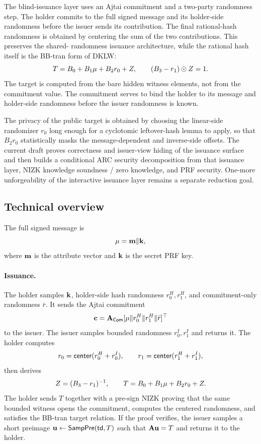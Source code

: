 The blind-issuance layer uses an Ajtai commitment and a two-party randomness step.  The holder commits
to the full signed message and its holder-side randomness before the issuer sends its contribution.  The final
rational-hash randomness is obtained by centering the sum of the two contributions.  This preserves the shared-
randomness issuance architecture, while the rational hash itself is the BB-tran form of DKLW:
\[
  T=B_0+B_1\mathbf{\mu}+B_2r_0+Z,\qquad (B_3-r_1)\odot Z=1.
\]
The target is computed from the bare hidden witness elements, not from the commitment value.  The commitment
serves to bind the holder to its message and holder-side randomness before the issuer randomness is known.

The privacy of the public target is obtained by choosing the linear-side randomizer $r_0$ long enough for a
cyclotomic leftover-hash lemma to apply, so that $B_2r_0$ statistically masks the message-dependent and
inverse-side offsets.  The current draft proves correctness and issuer-view hiding of the issuance surface and then
builds a conditional ARC security decomposition from that issuance layer, NIZK knowledge soundness / zero
knowledge, and PRF security.  One-more unforgeability of the interactive issuance layer remains a separate
reduction goal.

\subsection{Technical overview}
The full signed message is
\[
  \mathbf{\mu}=\mathbf{m}\Vert\mathbf{k},
\]
where $\mathbf{m}$ is the attribute vector and $\mathbf{k}$ is the secret PRF key.

\paragraph*{Issuance.}
The holder samples $\mathbf{k}$, holder-side hash randomness $r_0^H,r_1^H$, and commitment-only randomness
$\bar r$.  It sends the Ajtai commitment
\[
  \mathbf{c}=\mathbf{A}_{\mathsf{Com}}[\mathbf{\mu}\Vert r_0^H\Vert r_1^H\Vert \bar r]^\top
\]
to the issuer.  The issuer samples bounded randomness $r_0^I,r_1^I$ and returns it.  The holder computes
\[
  r_0=\mathsf{center}(r_0^H+r_0^I),\qquad
  r_1=\mathsf{center}(r_1^H+r_1^I),
\]
then derives
\[
  Z=(B_3-r_1)^{-1},\qquad
  T=B_0+B_1\mathbf{\mu}+B_2r_0+Z.
\]
The holder sends $T$ together with a pre-sign NIZK proving that the same bounded witness opens the
commitment, computes the centered randomness, and satisfies the BB-tran target relation.  If the proof
verifies, the issuer samples a short preimage $\mathbf{u}\gets\mathsf{SampPre}(\mathsf{td},T)$ such that $\mathbf{A}\mathbf{u}=T$ and
returns it to the holder.

